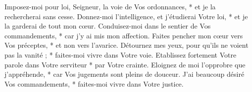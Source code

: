 Imposez-moi pour loi, Seigneur, la voie de Vos ordonnances, * et je la rechercherai sans cesse.
\versseparator
Donnez-moi l'intelligence, et j'étudierai Votre loi, * et je la garderai de tout mon cœur.
\versseparator
Conduisez-moi dans le sentier de Vos commandements, * car j'y ai mis mon affection.
\versseparator
Faites pencher mon cœur vers Vos préceptes, * et non vers l'avarice.
\versseparator
Détournez mes yeux, pour qu'ils ne voient pas la vanité ; * faites-moi vivre dans Votre voie.
\versseparator
Etablissez fortement Votre parole dans Votre serviteur * par Votre crainte.
\versseparator
Eloignez de moi l'opprobre que j'appréhende, * car Vos jugements sont pleins de douceur.
\versseparator
J'ai beaucoup désiré Vos commandements, * faites-moi vivre dans Votre justice.
